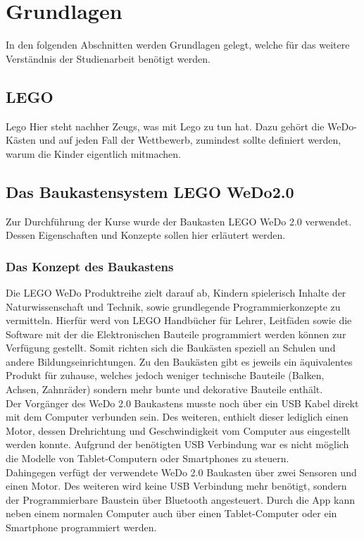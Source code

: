 \chapter{Grundlagen}

In den folgenden Abschnitten werden Grundlagen gelegt, welche für das weitere Verständnis der Studienarbeit benötigt werden.

\section{LEGO}
\gls{Lego}
Hier steht nachher Zeugs, was mit Lego zu tun hat. Dazu gehört die WeDo-Kästen und auf jeden Fall der Wettbewerb, zumindest sollte definiert werden, warum die Kinder eigentlich mitmachen.

\section{Das Baukastensystem LEGO WeDo2.0}
Zur Durchführung der Kurse wurde der Baukasten LEGO WeDo 2.0 verwendet. Dessen Eigenschaften und Konzepte sollen hier erläutert werden.
\subsection{Das Konzept des Baukastens}
Die LEGO WeDo Produktreihe zielt darauf ab, Kindern spielerisch Inhalte der Naturwissenschaft und Technik, sowie grundlegende Programmierkonzepte zu vermitteln. Hierfür werd von LEGO Handbücher für Lehrer, Leitfäden sowie die Software mit der die Elektronischen Bauteile programmiert werden können zur Verfügung gestellt. Somit richten sich die Baukästen speziell an Schulen und andere Bildungseinrichtungen. Zu den Baukästen gibt es jeweils ein äquivalentes Produkt für zuhause, welches jedoch weniger technische Bauteile (Balken, Achsen, Zahnräder) sondern mehr bunte und dekorative Bauteile enthält.\\ 
Der Vorgänger des WeDo 2.0 Baukastens musste noch über ein USB Kabel direkt mit dem Computer verbunden sein. Des weiteren, enthielt dieser lediglich einen Motor, dessen Drehrichtung und Geschwindigkeit vom Computer aus eingestellt werden konnte. Aufgrund der benötigten USB Verbindung war es nicht möglich die Modelle von Tablet-Computern oder Smartphones zu steuern.  \\
Dahingegen verfügt der verwendete WeDo 2.0 Baukasten über zwei Sensoren und einen Motor. Des weiteren wird keine USB Verbindung mehr benötigt, sondern der Programmierbare Baustein über Bluetooth angesteuert. Durch die App kann neben einem normalen Computer auch über einen Tablet-Computer oder ein Smartphone programmiert werden.

